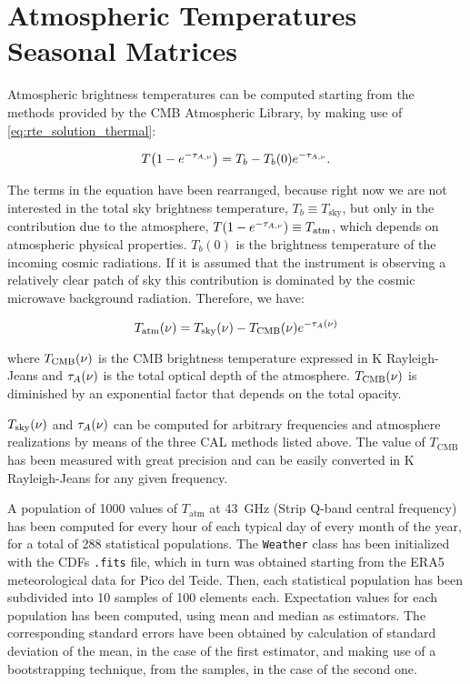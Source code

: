 \section{Atmospheric Temperatures Seasonal Matrices}

Atmospheric brightness temperatures can be computed starting from the
methods provided by the CMB Atmospheric Library, by making use of
\autoref{eq:rte_solution_thermal}:

\begin{equation}
        T\qty(1 - e^{-\tau_{A,\nu}})= T_b - T_b\qty(0) e^{-\tau_{A,\nu}}.
\end{equation}

The terms in the equation have been rearranged, because right now we are
not interested in the total sky brightness temperature, $T_b \equiv
T_\text{sky}$, but only in the contribution due to the atmosphere, $T\qty(1
- e^{-\tau_{A,\nu}}) \equiv T_\text{atm}$, which depends on atmospheric
physical properties. $T_b(0)$ is the brightness temperature of the incoming
cosmic radiations. If it is assumed that the instrument is observing a
relatively clear patch of sky this contribution is dominated by the cosmic
microwave background radiation. Therefore, we have:

\begin{equation}
        T_\text{atm}\qty(\nu) = T_\text{sky}\qty(\nu) -
        T_\text{CMB}\qty(\nu)e^{-\tau_A\qty(\nu)}
        \label{eq:tatm_formula}
\end{equation}

where $T_\text{CMB}\qty(\nu)$ is the CMB brightness temperature expressed
in \si{\kelvin} Rayleigh-Jeans and $\tau_A\qty(\nu)$ is the total optical
depth of the atmosphere. $T_\text{CMB}\qty(\nu)$ is diminished by an
exponential factor that depends on the total opacity.

$T_\text{sky}\qty(\nu)$ and $\tau_A\qty(\nu)$ can be computed for arbitrary
frequencies and atmosphere realizations by means of the three CAL methods
listed above. The value of $T_\text{CMB}$ has been measured with great
precision and can be easily converted in \si{\kelvin} Rayleigh-Jeans for any
given frequency.

A population of \num{1000} values of $T_\text{atm}$ at \SI{43}{\giga\hertz}
(Strip Q-band central frequency) has been computed for every hour of each
typical day of every month of the year, for a total of \num{288}
statistical populations. The \texttt{Weather} class has been initialized
with the CDFs \texttt{.fits} file, which in turn was obtained starting from
the ERA5 meteorological data for Pico del Teide. Then, each statistical
population has been subdivided into \num{10} samples of \num{100} elements
each. Expectation values for each population has been computed, using mean
and median as estimators. The corresponding standard errors have been
obtained by calculation of standard deviation of the mean, in the case of
the first estimator, and making use of a bootstrapping technique, from the
samples, in the case of the second one.

